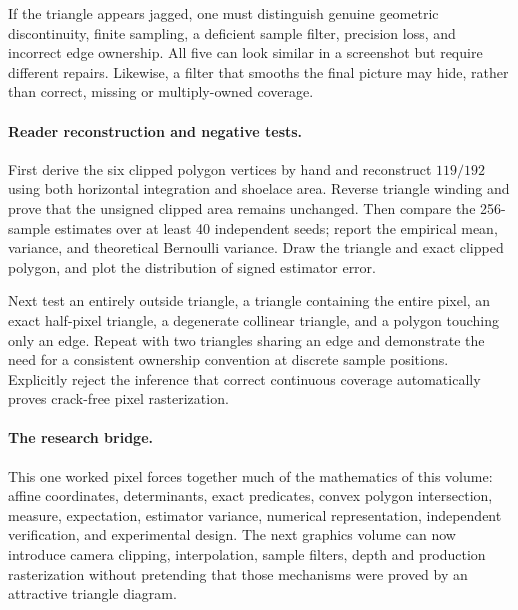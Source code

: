 If the triangle appears jagged, one must distinguish genuine
geometric discontinuity, finite sampling, a deficient sample
filter, precision loss, and incorrect edge ownership. All five
can look similar in a screenshot but require different repairs.
Likewise, a filter that smooths the final picture may hide,
rather than correct, missing or multiply-owned coverage.

\paragraph{Reader reconstruction and negative tests.}
First derive the six clipped polygon vertices by hand and
reconstruct \(119/192\) using both horizontal integration
and shoelace area. Reverse triangle winding and prove that
the unsigned clipped area remains unchanged. Then compare
the 256-sample estimates over at least 40 independent seeds;
report the empirical mean, variance, and theoretical
Bernoulli variance. Draw the triangle and exact clipped
polygon, and plot the distribution of signed estimator error.

Next test an entirely outside triangle, a triangle containing
the entire pixel, an exact half-pixel triangle, a degenerate
collinear triangle, and a polygon touching only an edge.
Repeat with two triangles sharing an edge and demonstrate the
need for a consistent ownership convention at discrete
sample positions. Explicitly reject the inference that
correct continuous coverage automatically proves
crack-free pixel rasterization.

\paragraph{The research bridge.}
This one worked pixel forces together much of the mathematics
of this volume: affine coordinates, determinants, exact
predicates, convex polygon intersection, measure,
expectation, estimator variance, numerical representation,
independent verification, and experimental design. The next
graphics volume can now introduce camera clipping,
interpolation, sample filters, depth and production
rasterization without pretending that those mechanisms
were proved by an attractive triangle diagram.
